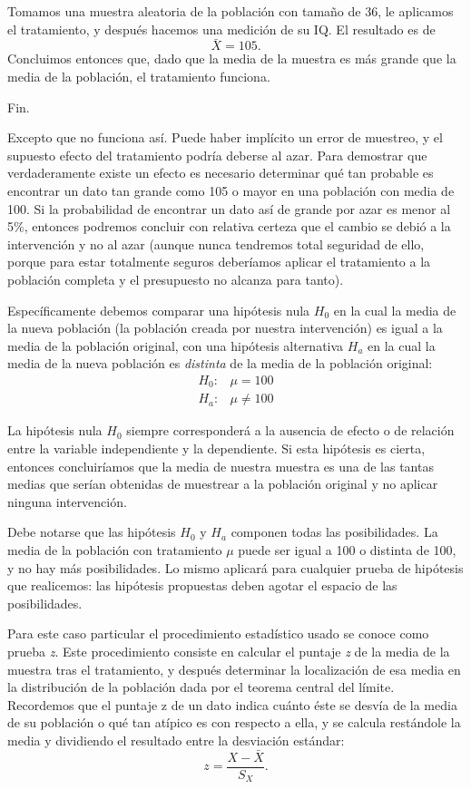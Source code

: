 \documentclass[a4paper,12pt]{article}
\begin{document}
Tomamos una muestra aleatoria de la población con tamaño de 36, le aplicamos el tratamiento, y después hacemos una medición de su IQ. El resultado es de
\[
  \bar{X} = 105
.\]
Concluimos entonces que, dado que la media de la muestra es más grande que la media de la población, el tratamiento funciona.

Fin.

\newpage

Excepto que no funciona así. Puede haber implícito un error de muestreo, y el supuesto efecto del tratamiento podría deberse al azar. Para demostrar que verdaderamente existe un efecto es necesario determinar qué tan probable es encontrar un dato tan grande como 105 o mayor en una población con  media de 100. Si la probabilidad de encontrar un dato así de grande por azar es menor al 5\%, entonces podremos concluir con relativa certeza que el cambio se debió a la intervención y no al azar (aunque nunca tendremos total seguridad de ello, porque para estar totalmente seguros deberíamos aplicar el tratamiento a la población completa y el presupuesto no alcanza para tanto).

Específicamente debemos comparar una  hipótesis nula $H_{0}$ en la cual la media de la nueva población (la población creada por nuestra intervención) es igual a la media de la población original, con una hipótesis alternativa $H_{a}$ en la cual la media de la nueva población es {\slshape distinta} de la media de la población original:
\begin{eqnarray*}
  H_{0}: & \mu = 100\\
  H_{a}: & \mu \neq 100
\end{eqnarray*}

La hipótesis nula $H_{0}$ siempre corresponderá a la ausencia de efecto o de relación entre la variable independiente y la dependiente. Si esta hipótesis es cierta, entonces concluiríamos que la media de nuestra muestra es una de las tantas medias que serían obtenidas de muestrear a la población original y no aplicar ninguna intervención.

Debe notarse que las hipótesis $H_{0}$ y $H_{a}$ componen todas las posibilidades. La media de la población con tratamiento $\mu$ puede ser igual a 100 o distinta de 100, y no hay más posibilidades. Lo mismo aplicará para cualquier prueba de hipótesis que realicemos: las hipótesis propuestas deben agotar el espacio de las posibilidades.

Para este caso particular el procedimiento estadístico usado se conoce como prueba {\itshape z}. Este procedimiento consiste en calcular el puntaje {\itshape z} de la media de la muestra tras el tratamiento, y después determinar la localización de esa media en la distribución de la población dada por el teorema central del límite. Recordemos que el puntaje z de un dato indica cuánto éste se desvía de la media de su población o qué tan atípico es con respecto a ella, y se calcula restándole la media y dividiendo el resultado entre la desviación estándar:
\[
  z = \frac{
    X - \bar{X}
  }{
    S_{X}
  }
.\]
\end{document}
